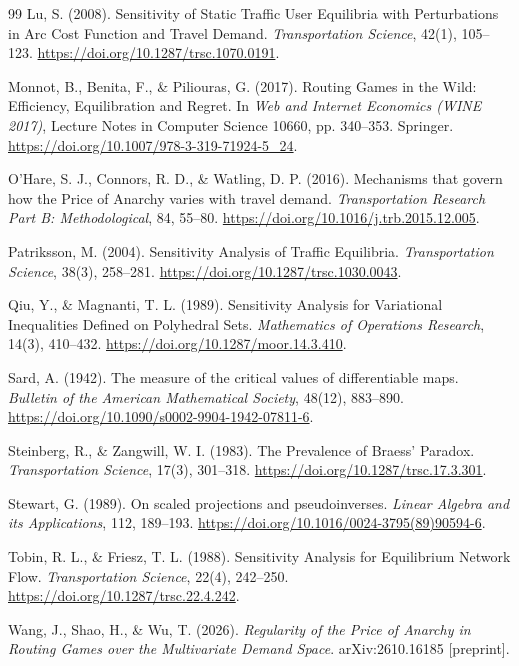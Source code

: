 \begin{thebibliography}{99}
Lu, S. (2008). Sensitivity of Static Traffic User Equilibria with Perturbations in Arc Cost Function and Travel Demand. \emph{Transportation Science}, 42(1), 105--123. \url{https://doi.org/10.1287/trsc.1070.0191}.

Monnot, B., Benita, F., \& Piliouras, G. (2017). Routing Games in the Wild: Efficiency, Equilibration and Regret. In \emph{Web and Internet Economics (WINE 2017)}, Lecture Notes in Computer Science 10660, pp. 340--353. Springer. \url{https://doi.org/10.1007/978-3-319-71924-5_24}.

O'Hare, S. J., Connors, R. D., \& Watling, D. P. (2016). Mechanisms that govern how the Price of Anarchy varies with travel demand. \emph{Transportation Research Part B: Methodological}, 84, 55--80. \url{https://doi.org/10.1016/j.trb.2015.12.005}.

Patriksson, M. (2004). Sensitivity Analysis of Traffic Equilibria. \emph{Transportation Science}, 38(3), 258--281. \url{https://doi.org/10.1287/trsc.1030.0043}.

Qiu, Y., \& Magnanti, T. L. (1989). Sensitivity Analysis for Variational Inequalities Defined on Polyhedral Sets. \emph{Mathematics of Operations Research}, 14(3), 410--432. \url{https://doi.org/10.1287/moor.14.3.410}.

Sard, A. (1942). The measure of the critical values of differentiable maps. \emph{Bulletin of the American Mathematical Society}, 48(12), 883--890. \url{https://doi.org/10.1090/s0002-9904-1942-07811-6}.

Steinberg, R., \& Zangwill, W. I. (1983). The Prevalence of Braess' Paradox. \emph{Transportation Science}, 17(3), 301--318. \url{https://doi.org/10.1287/trsc.17.3.301}.

Stewart, G. (1989). On scaled projections and pseudoinverses. \emph{Linear Algebra and its Applications}, 112, 189--193. \url{https://doi.org/10.1016/0024-3795(89)90594-6}.

Tobin, R. L., \& Friesz, T. L. (1988). Sensitivity Analysis for Equilibrium Network Flow. \emph{Transportation Science}, 22(4), 242--250. \url{https://doi.org/10.1287/trsc.22.4.242}.

Wang, J., Shao, H., \& Wu, T. (2026). \emph{Regularity of the Price of Anarchy in Routing Games over the Multivariate Demand Space}. arXiv:2610.16185 [preprint].


\end{thebibliography}
